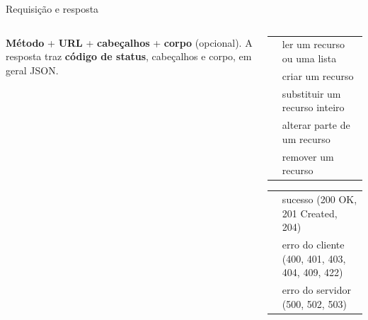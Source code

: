 \documentclass[aspectratio=169,10pt]{beamer}
\begin{document}
\begin{frame}{Requisição e resposta}
  \begin{columns}[c]
    \begin{column}{0.52\textwidth}
      \centering
      \vspace{6pt}
      \begin{conceito}
        \textbf{Método} + \textbf{URL} + \textbf{cabeçalhos} + \textbf{corpo} (opcional). A resposta traz \textbf{código de status}, cabeçalhos e corpo, em geral JSON.
      \end{conceito}
    \end{column}
    \begin{column}{0.46\textwidth}
      \scriptsize
      \begin{tabularx}{\linewidth}{@{}l L@{}}
        \toprule
         &  \\
        \midrule
         & ler um recurso ou uma lista \\
         & criar um recurso \\
         & substituir um recurso inteiro \\
         & alterar parte de um recurso \\
         & remover um recurso \\
        \bottomrule
      \end{tabularx}
      \vspace{4pt}
      \begin{tabularx}{\linewidth}{@{}l L@{}}
        \toprule
         &  \\
        \midrule
         & sucesso (200 OK, 201 Created, 204) \\
         & erro do cliente (400, 401, 403, 404, 409, 422) \\
         & erro do servidor (500, 502, 503) \\
        \bottomrule
      \end{tabularx}
    \end{column}
  \end{columns}
\end{frame}
\end{document}
